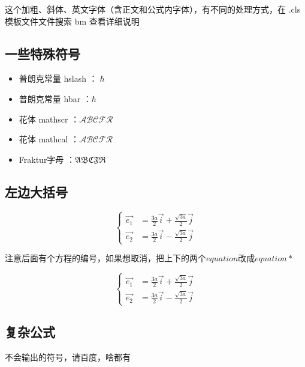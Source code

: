 \documentclass[AutoFakeBold]{LZUThesis}
\begin{document}
这个加粗、斜体、英文字体（含正文和公式内字体），有不同的处理方式，在 .cls 模板文件文件搜索 bm 查看详细说明

\subsection{一些特殊符号}

\begin{itemize}
    \item 普朗克常量 hslash ：$\hslash$
    \item 普朗克常量 hbar ：$\hbar$
    \item 花体 mathscr ：$\mathscr{ABCFR}$
    \item 花体 mathcal ：$\mathcal{ABCFR}$
    \item Fraktur字母 ：$\mathfrak{ABCFR}$
\end{itemize}




\subsection{左边大括号}
\label{sub:左边大括号}

\begin{equation}
    \left\{
    \begin{array}{rcl}
        \vec{e_1} & = \frac{3a}{2} \vec{i} + \frac{\sqrt{3a}}{2} \vec{j} \\
        \vec{e_2} & = \frac{3a}{2} \vec{i} - \frac{\sqrt{3a}}{2} \vec{j}
    \end{array}
    \right.
    \label{e1e2}
\end{equation}

注意后面有个方程的编号，如果想取消，把上下的两个$equation$改成$equation*$

\begin{equation*}
    \left\{
    \begin{array}{rcl}
        \vec{e_1} & = \frac{3a}{2} \vec{i} + \frac{\sqrt{3a}}{2} \vec{j} \\
        \vec{e_2} & = \frac{3a}{2} \vec{i} - \frac{\sqrt{3a}}{2} \vec{j}
    \end{array}
    \right.
    \label{e1e2_2}
\end{equation*}


\subsection{复杂公式}
\label{sub:复杂公式}
不会输出的符号，请百度，啥都有
\end{document}
